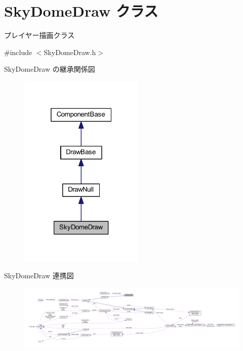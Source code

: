 \hypertarget{class_sky_dome_draw}{}\section{Sky\+Dome\+Draw クラス}
\label{class_sky_dome_draw}


プレイヤー描画クラス  




{\ttfamily \#include $<$Sky\+Dome\+Draw.\+h$>$}



Sky\+Dome\+Draw の継承関係図\nopagebreak
\begin{figure}[H]
\begin{center}
\leavevmode
\includegraphics[width=169pt]{class_sky_dome_draw__inherit__graph}
\end{center}
\end{figure}


Sky\+Dome\+Draw 連携図\nopagebreak
\begin{figure}[H]
\begin{center}
\leavevmode
\includegraphics[width=350pt]{class_sky_dome_draw__coll__graph}
\end{center}
\end{figure}
